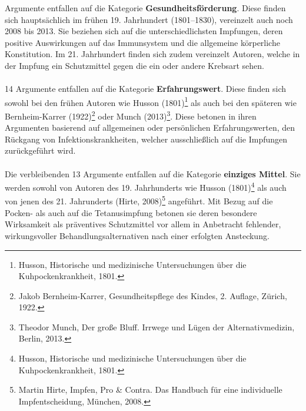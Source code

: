 \documentclass[
    a4paper,
    12pt,
    hyphens,
    chapterprefix=true,
    headheight=33pt,
    footheight=29pt,
    headings=optiontohead,
]{scrartcl}
\begin{document}
{ Argumente entfallen auf die Kategorie \textbf{Gesundheitsförderung}. Diese finden sich hauptsächlich im frühen 19. Jahrhundert (1801--1830), vereinzelt auch noch 2008 bis 2013. Sie beziehen sich auf die unterschiedlichsten Impfungen, deren positive Auswirkungen auf das Immunsystem und die allgemeine körperliche Konstitution. Im 21. Jahrhundert finden sich zudem vereinzelt Autoren, welche in der Impfung ein Schutzmittel gegen die ein oder andere Krebsart sehen.\\
\\
14 Argumente entfallen auf die Kategorie \textbf{Erfahrungswert}. Diese finden sich sowohl bei den frühen Autoren wie Husson (1801)\footnote{Husson, Historische und medizinische Untersuchungen über die Kuhpockenkrankheit, 1801.} als auch bei den späteren wie
Bernheim-Karrer (1922)\footnote{Jakob Bernheim-Karrer, Gesundheitspflege des Kindes, 2. Auflage, Zürich, 1922.} oder Munch (2013)\footnote{Theodor Munch, Der große Bluff. Irrwege und Lügen der Alternativmedizin, Berlin, 2013.}. Diese betonen in ihren Argumenten basierend auf allgemeinen oder persönlichen Erfahrungswerten, den Rückgang von Infektionskrankheiten, welcher ausschließlich auf die Impfungen zurückgeführt wird.\\
\\
Die verbleibenden 13 Argumente entfallen auf die Kategorie \textbf{einziges Mittel}. Sie werden sowohl von Autoren des 19. Jahrhunderts wie Husson (1801)\footnote{Husson, Historische und medizinische Untersuchungen über die Kuhpockenkrankheit, 1801.} als auch von jenen des 21. Jahrunderts (Hirte, 2008)\footnote{Martin Hirte, Impfen, Pro \& Contra. Das Handbuch für eine individuelle Impfentscheidung, München, 2008.} angeführt. Mit Bezug auf die Pocken- als auch auf die Tetanusimpfung betonen sie deren besondere Wirksamkeit als präventives Schutzmittel vor allem in Anbetracht fehlender, wirkungsvoller Behandlungsalternativen nach einer erfolgten Ansteckung.

}
\end{document}
